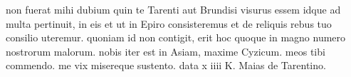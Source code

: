 


non fuerat mihi dubium quin te Tarenti aut
              Brundisi visurus essem idque ad multa pertinuit, in eis et ut in
              Epiro consisteremus et de reliquis rebus tuo consilio uteremur. quoniam id non contigit, erit hoc quoque in magno numero nostrorum malorum. nobis iter est in Asiam, maxime Cyzicum. meos tibi commendo. me vix misereque sustento. data x iiii K. Maias de Tarentino.

